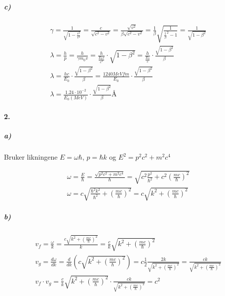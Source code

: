 \documentclass[11pt, A4paper,norsk]{article}
\begin{document}
			\subparagraph{c)}
				\begin{gather*}
\gamma = \frac{1}{\sqrt{1 - \frac{v^2}{c^2}}} = \frac{c}{\sqrt{c^2 - v^2}} = \frac{\sqrt{v^2}}{\beta \sqrt{c^2 - v^2}} = \frac{1}{\beta} \sqrt{\frac{1}{\frac{1}{\beta}^2 - 1}} = \frac{1}{\sqrt{1 - \beta^2}} \\
\lambda = \frac{h}{p} = \frac{h}{\gamma m_0 v} = \frac{h}{\frac{E_0 v}{c^2}} \cdot \sqrt{1 - \beta^2} = \frac{h}{\frac{E_0}{c}} \cdot \frac{\sqrt{1 - \beta^2}}{\beta} \\
\lambda = \frac{h c}{E_0} \cdot \frac{\sqrt{1 - \beta^2}}{\beta} = \frac{1240 MeV fm}{E_0} \cdot \frac{\sqrt{1 - \beta^2}}{\beta} \\
\lambda = \frac{1.24 \cdot 10^{-2}}{E_0 (MeV)} \cdot \frac{\sqrt{1 - \beta^2}}{\beta} \text{Å}
				\end{gather*}
			









		\paragraph{2.}
			\subparagraph{a)}
				\begin{flushleft}
Bruker likningene $E = \omega \hbar$, $p = \hbar k$ og $E^2 = p^2c^2 + m^2 c^4$
				\end{flushleft}
				\begin{gather*}
\omega = \frac{E}{\hbar} = \frac{\sqrt{p^2 c^2 + m^2 c^4}}{\hbar} = \sqrt{c^2 \frac{p^2}{\hbar^2} + c^2 \left(\frac{m c}{\hbar}\right)^2} \\
\omega = c \sqrt{\frac{\hbar^2 k^2}{\hbar^2} + \left( \frac{m c}{\hbar} \right)^2} = c \sqrt{k^2 + \left( \frac{m c}{\hbar} \right)^2}
				\end{gather*}










			\subparagraph{b)}
				\begin{gather*}
v_f = \frac{\omega}{k} = \frac{c \sqrt{k^2 + \left( \frac{m c}{\hbar} \right)^2}}{k} = \frac{c}{k} \sqrt{k^2 + \left( \frac{m c}{\hbar} \right)^2} \\
v_g = \frac{d \omega}{dk} = \frac{d}{dk} \left( c \sqrt{k^2 + \left( \frac{m c}{\hbar} \right)^2} \right) = c\frac{1}{2} \frac{2k}{\sqrt{k^2 + \left( \frac{m c}{\hbar} \right)^2}} = \frac{c k}{\sqrt{k^2 + \left( \frac{m c}{\hbar} \right)^2}} \\
v_f \cdot v_g = \frac{c}{k} \sqrt{k^2 + \left( \frac{m c}{\hbar} \right)^2} \cdot \frac{c k}{\sqrt{k^2 + \left( \frac{m c}{\hbar} \right)^2}} = c^2
				\end{gather*}
\end{document}

